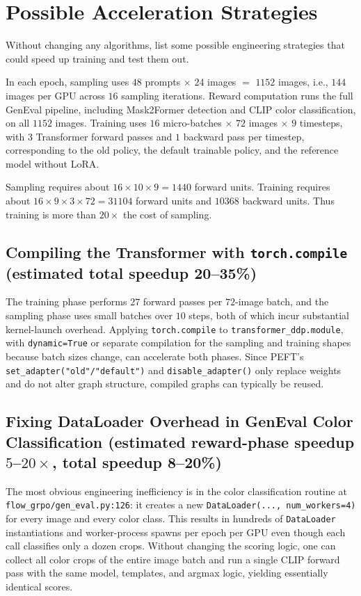 \documentclass{article} %
\begin{document}
\section{Possible Acceleration Strategies}
Without changing any algorithms, list some possible engineering strategies that could speed up training and test them out.

In each epoch, sampling uses \(48\) prompts \(\times\) \(24\) images \(=\) \(1152\) images, i.e., \(144\) images per GPU across \(16\) sampling iterations. Reward computation runs the full GenEval pipeline, including Mask2Former detection and CLIP color classification, on all \(1152\) images. Training uses \(16\) micro-batches \(\times\) \(72\) images \(\times\) \(9\) timesteps, with \(3\) Transformer forward passes and \(1\) backward pass per timestep, corresponding to the old policy, the default trainable policy, and the reference model without LoRA.

Sampling requires about \(16 \times 10 \times 9 = 1440\) forward units. Training requires about \(16 \times 9 \times 3 \times 72 = 31104\) forward units and \(10368\) backward units. Thus training is more than \(20\times\) the cost of sampling.

\subsection{Compiling the Transformer with \texttt{torch.compile} (estimated total speedup 20--35\%)}
The training phase performs \(27\) forward passes per \(72\)-image batch, and the sampling phase uses small batches over \(10\) steps, both of which incur substantial kernel-launch overhead. Applying \texttt{torch.compile} to \texttt{transformer\_ddp.module}, with \texttt{dynamic=True} or separate compilation for the sampling and training shapes because batch sizes change, can accelerate both phases. Since PEFT's \texttt{set\_adapter("old"/"default")} and \texttt{disable\_adapter()} only replace weights and do not alter graph structure, compiled graphs can typically be reused.

\subsection{Fixing DataLoader Overhead in GenEval Color Classification (estimated reward-phase speedup \(5\)--\(20\times\), total speedup 8--20\%)}
The most obvious engineering inefficiency is in the color classification routine at \texttt{flow\_grpo/gen\_eval.py:126}: it creates a new \texttt{DataLoader(..., num\_workers=4)} for every image and every color class. This results in hundreds of \texttt{DataLoader} instantiations and worker-process spawns per epoch per GPU even though each call classifies only a dozen crops. Without changing the scoring logic, one can collect all color crops of the entire image batch and run a single CLIP forward pass with the same model, templates, and argmax logic, yielding essentially identical scores.
\end{document}
